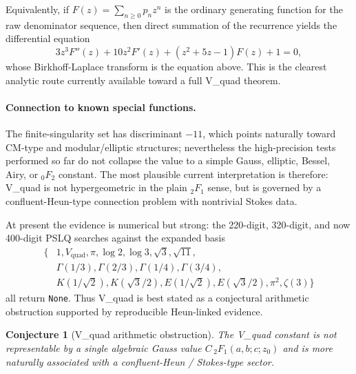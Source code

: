 \documentclass[11pt]{article}
\newtheorem{conjecture}[theorem]{Conjecture}
\begin{document}
Equivalently, if $F(z)=\sum_{n\ge 0} p_n z^n$ is the ordinary generating function for the raw denominator sequence, then direct summation of the recurrence yields the differential equation
\[
  3z^3 F''(z) + 10z^2 F'(z) + (z^2+5z-1)F(z) + 1 = 0,
\]
whose Birkhoff-Laplace transform is the equation above. This is the clearest analytic route currently available toward a full V\_quad theorem.

\paragraph{Connection to known special functions.}
The finite-singularity set has discriminant $-11$, which points naturally toward CM-type and modular/elliptic structures; nevertheless the high-precision tests performed so far do not collapse the value to a simple Gauss, elliptic, Bessel, Airy, or ${}_0F_2$ constant. The most plausible current interpretation is therefore: V\_quad is not hypergeometric in the plain ${}_2F_1$ sense, but is governed by a confluent-Heun-type connection problem with nontrivial Stokes data.

At present the evidence is numerical but strong: the 220-digit, 320-digit, and now 400-digit PSLQ searches against the expanded basis
\[
\begin{aligned}
\{&1, V_{\mathrm{quad}}, \pi, \log 2, \log 3, \sqrt 3, \sqrt{11},\\
&\Gamma(1/3), \Gamma(2/3), \Gamma(1/4), \Gamma(3/4),\\
&K(1/\sqrt 2), K(\sqrt 3/2), E(1/\sqrt 2), E(\sqrt 3/2), \pi^2, \zeta(3)\}
\end{aligned}
\]
all return \texttt{None}. Thus V\_quad is best stated as a conjectural arithmetic obstruction supported by reproducible Heun-linked evidence.

\begin{conjecture}[V\_quad arithmetic obstruction]\label{conj:vquad-outline}
The V\_quad constant is not representable by a single algebraic Gauss value $C\,{}_2F_1(a,b;c;z_0)$ and is more naturally associated with a confluent-Heun / Stokes-type sector.
\end{conjecture}
\end{document}
